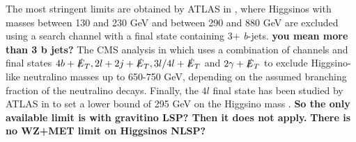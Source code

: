 \documentclass[a4paper,11pt]{article}
\newcommand{\Shufang}[1]{{\bf\color{Maroon}  #1}}
\begin{document}
The most stringent limits are obtained by ATLAS in \cite{Aaboud:2018htj},
where Higgsinos with masses between 130 and 230 GeV and between 290 and 880 
GeV are excluded using a search channel with a final state containing 3+ 
\emph{b}-jets. \Shufang{you mean more than 3 b jets?} The CMS analysis
in \cite{Sirunyan:2017ubx} which uses a combination of channels and final states 
$4b+\slashed{E}_T, 2l + 2j + \slashed{E}_T, 3l/4l + \slashed{E}_T$ and $2\gamma+\slashed{E}_T$ 
to exclude Higgsino-like neutralino masses up to 650-750 GeV, depending on the assumed branching 
fraction of the neutralino decays. Finally, the $4l$ final state has been studied by ATLAS in \cite{Aaboud:2018zeb}
to set a lower bound of 295 GeV on the Higgsino mass  \cite{Aaboud:2018zeb}.
\Shufang{So the only available limit is with gravitino LSP?  Then it does not apply.}
\Shufang{There is no  WZ+MET limit on Higgsinos NLSP?}

\end{document}
